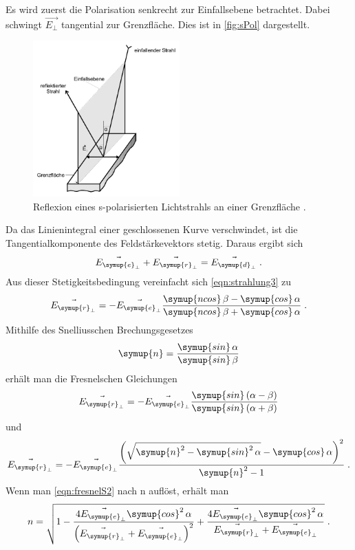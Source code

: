 Es wird zuerst die Polarisation senkrecht zur Einfallsebene betrachtet. Dabei schwingt $\vec{E_{\perp}}$ tangential zur Grenzfläche. Dies ist in 
\autoref{fig:sPol} dargestellt. 
\begin{figure}
    \centering
    \includegraphics[height = 6cm]{sPol.pdf}
    \caption{Reflexion eines s-polarisierten Lichtstrahls an einer Grenzfläche \cite{ap407}.}
    \label{fig:sPol}
\end{figure}
Da das Linienintegral einer geschlossenen Kurve verschwindet, ist die Tangentialkomponente des Feldstärkevektors stetig. Daraus ergibt sich
\begin{equation*}
    \vec{E_{\symup{e}_{\perp}}} + \vec{E_{\symup{r}_{\perp}}} = \vec{E_{\symup{d}_{\perp}}} \; .
\end{equation*}
Aus dieser Stetigkeitsbedingung vereinfacht sich \autoref{eqn:strahlung3} zu 
\begin{equation*}
    \vec{E_{\symup{r}_{\perp}}} = - \vec{E_{\symup{e}_{\perp}}} \frac{\symup{ncos}\,\beta - \symup{cos}\,\alpha}{\symup{ncos}\,\beta + \symup{cos}\,\alpha} \; .
\end{equation*}
Mithilfe des Snelliusschen Brechungsgesetzes
\begin{equation*}
    \symup{n} = \frac{\symup{sin}\, \alpha}{\symup{sin}\, \beta}
\end{equation*}
erhält man die Fresnelschen Gleichungen 
\begin{equation*}
    \vec{E_{\symup{r}_{\perp}}} = - \vec{E_{\symup{e}_{\perp}}} \frac{\symup{sin}\left(\alpha - \beta\right)}{\symup{sin}\left(\alpha + \beta\right)}
\end{equation*}
und
\begin{equation}
    \vec{E_{\symup{r}_{\perp}}} = - \vec{E_{\symup{e}_{\perp}}} \frac{\left(\sqrt{\symup{n}^2-\symup{sin}^2 \, \alpha}-\symup{cos}\, \alpha\right)^2}{\symup{n}^2 - 1} \; .
    \label{eqn:fresnelS2}
\end{equation}
Wenn man \autoref{eqn:fresnelS2} nach n auflöst, erhält man
\begin{equation*}
    n = \sqrt{1-\frac{4\vec{E_{\symup{e}_{\perp}}}\symup{cos}^2\, \alpha}{\left(\vec{E_{\symup{r}_{\perp}}}+\vec{E_{\symup{e}_{\perp}}}\right)^2}+\frac{4\vec{E_{\symup{e}_{\perp}}}\symup{cos}^2\, \alpha}{\vec{E_{\symup{r}_{\perp}}}+\vec{E_{\symup{e}_{\perp}}}}} \; .
\end{equation*}


